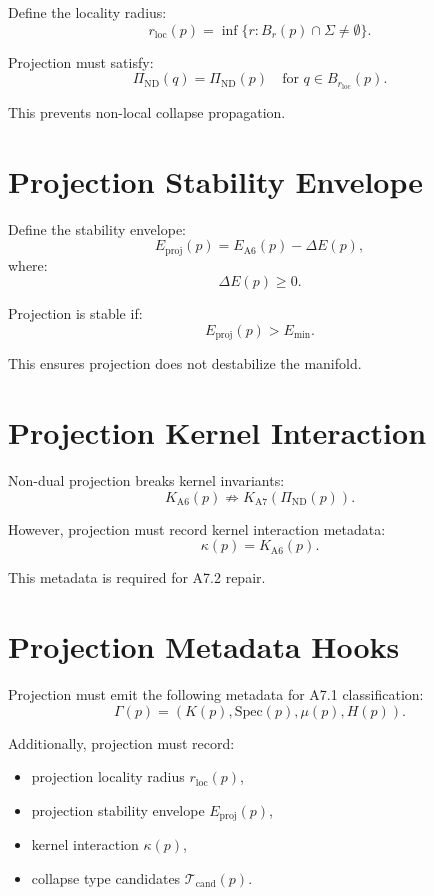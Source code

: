 \documentclass[11pt]{article}
\begin{document}
Define the locality radius:
\[
r_{\mathrm{loc}}(p) = \inf \{ r : B_r(p) \cap \Sigma \neq \emptyset \}.
\]

Projection must satisfy:
\[
\Pi_{\mathrm{ND}}(q) = \Pi_{\mathrm{ND}}(p)
\quad \text{for } q \in B_{r_{\mathrm{loc}}}(p).
\]

This prevents non-local collapse propagation.

\section{Projection Stability Envelope}

Define the stability envelope:
\[
E_{\mathrm{proj}}(p) = E_{\mathrm{A6}}(p) - \Delta E(p),
\]
where:
\[
\Delta E(p) \ge 0.
\]

Projection is stable if:
\[
E_{\mathrm{proj}}(p) > E_{\min}.
\]

This ensures projection does not destabilize the manifold.

\section{Projection Kernel Interaction}

Non-dual projection breaks kernel invariants:
\[
K_{\mathrm{A6}}(p) \not\Rightarrow K_{\mathrm{A7}}(\Pi_{\mathrm{ND}}(p)).
\]

However, projection must record kernel interaction metadata:
\[
\kappa(p) = K_{\mathrm{A6}}(p).
\]

This metadata is required for A7.2 repair.

\section{Projection Metadata Hooks}

Projection must emit the following metadata for A7.1 classification:
\[
\Gamma(p) = (K(p), \mathrm{Spec}(p), \mu(p), H(p)).
\]

Additionally, projection must record:
\begin{itemize}
  \item projection locality radius $r_{\mathrm{loc}}(p)$,
  \item projection stability envelope $E_{\mathrm{proj}}(p)$,
  \item kernel interaction $\kappa(p)$,
  \item collapse type candidates $\mathcal{T}_{\mathrm{cand}}(p)$.
\end{itemize}
\end{document}
